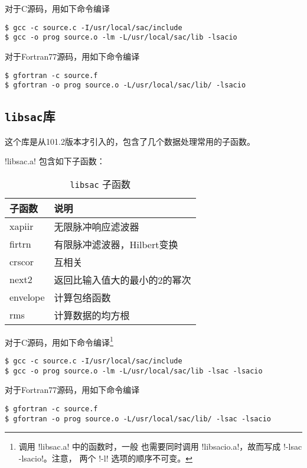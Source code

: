 对于C源码，用如下命令编译
\begin{verbatim}
$ gcc -c source.c -I/usr/local/sac/include
$ gcc -o prog source.o -lm -L/usr/local/sac/lib -lsacio
\end{verbatim}

对于Fortran77源码，用如下命令编译
\begin{verbatim}
$ gfortran -c source.f
$ gfortran -o prog source.o -L/usr/local/sac/lib/ -lsacio
\end{verbatim}

\subsection{\texttt{libsac}库}
这个库是从101.2版本才引入的，包含了几个数据处理常用的子函数。

!libsac.a! 包含如下子函数：
\begin{table}[H]
\centering
\caption{\texttt{libsac} 子函数}
\ttfamily
\begin{tabular}{ll}
\toprule
子函数      &       说明            \\
\midrule
xapiir      &       无限脉冲响应滤波器 \\
firtrn      &       有限脉冲滤波器，Hilbert变换 \\
crscor      &       互相关 \\
next2       &       返回比输入值大的最小的2的幂次 \\
envelope    &       计算包络函数 \\
rms         &       计算数据的均方根 \\
\bottomrule
\end{tabular}
\end{table}

对于C源码，用如下命令编译\footnote{调用 !libsac.a! 中的函数时，一般
也需要同时调用 !libsacio.a!，故而写成 !-lsac -lsacio!。注意，
两个 !-l! 选项的顺序不可变。}
\begin{verbatim}
$ gcc -c source.c -I/usr/local/sac/include
$ gcc -o prog source.o -lm -L/usr/local/sac/lib -lsac -lsacio
\end{verbatim}

对于Fortran77源码，用如下命令编译
\begin{verbatim}
$ gfortran -c source.f
$ gfortran -o prog source.o -L/usr/local/sac/lib/ -lsac -lsacio
\end{verbatim}
